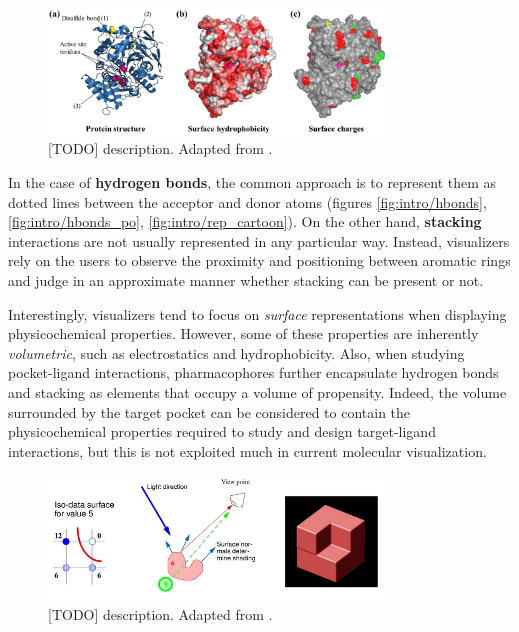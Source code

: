     \begin{figure}[H]
      \centering
      \includegraphics[width=0.8\textwidth]{figures/intro/rep_surfaces.png}
      \caption{\label{fig:intro/rep_surfaces} [TODO] description. Adapted from \cite{representations_2018}.}
    \end{figure}

    In the case of \textbf{hydrogen bonds}, the common approach is to represent them as dotted lines between the acceptor and donor atoms (figures \ref{fig:intro/hbonds}, \ref{fig:intro/hbonds_po}, \ref{fig:intro/rep_cartoon}). On the other hand, \textbf{stacking} interactions are not usually represented in any particular way. Instead, visualizers rely on the users to observe the proximity and positioning between aromatic rings and judge in an approximate manner whether stacking can be present or not.

    Interestingly, visualizers tend to focus on \textit{surface} representations when displaying physicochemical properties. However, some of these properties are inherently \textit{volumetric}, such as electrostatics and hydrophobicity. Also, when studying pocket-ligand interactions, pharmacophores further encapsulate hydrogen bonds and stacking as elements that occupy a volume of propensity. Indeed, the volume surrounded by the target pocket can be considered to contain the physicochemical properties required to study and design target-ligand interactions, but this is not exploited much in current molecular visualization.

    \begin{figure}[H]
      \centering
      \includegraphics[width=0.8\textwidth]{figures/intro/isosurfaces.png}
      \caption{\label{fig:intro/isosurfaces} [TODO] description. Adapted from \cite{isosurfaces_web}.}
    \end{figure}

